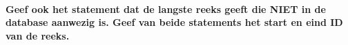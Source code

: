
\paragraph{
Geef ook het statement dat de langste reeks geeft die NIET in de database aanwezig is. Geef van beide statements het start en eind ID van de reeks.
}




